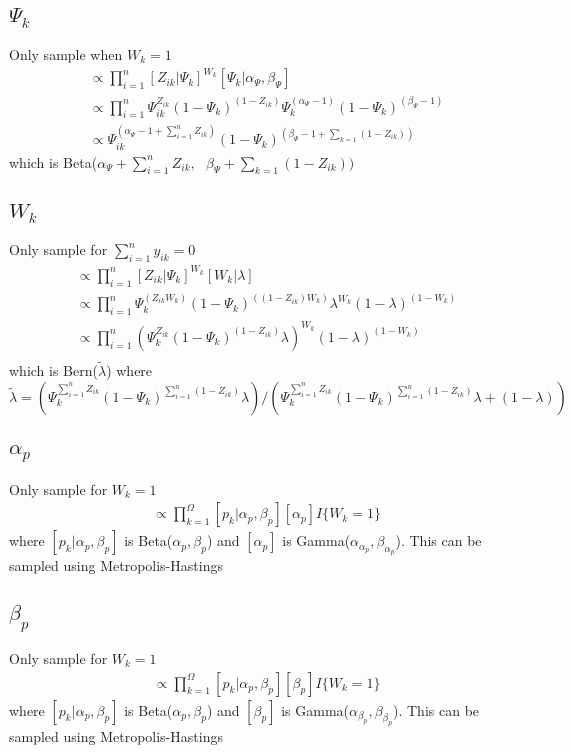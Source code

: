 \documentclass[fleqn]{article}
\begin{document}
\subsection{$\Psi_k$}
%
Only sample when $W_k = 1$
%
\begin{align*}
  [\Psi_k | \cdot] & \propto \prod_{i = 1}^n [Z_{ik} | \Psi_k]^{W_k} [\Psi_k | \alpha_\Psi, \beta_\Psi]\\
  & \propto \prod_{i = 1}^n \Psi_{ik}^{Z_{ik}} (1 - \Psi_k)^{(1 - Z_{ik})} \Psi_k^{(\alpha_\Psi - 1)} (1 - \Psi_k)^{(\beta_\Psi - 1)}\\
  & \propto \Psi_{ik}^{(\alpha_\Psi - 1 + \sum_{i = 1}^n Z_{ik})} (1 - \Psi_k)^{(\beta_\Psi - 1 + \sum_{k = 1} (1 - Z_{ik}))}
\end{align*}
which is Beta($\alpha_\Psi + \sum_{i = 1}^n Z_{ik}, \mbox{ } \beta_\Psi + \sum_{k = 1} (1 - Z_{ik}))$
%
\subsection{$W_k$}
%
Only sample for $\sum_{i = 1}^{n} y_{ik} = 0$
%
\begin{align*}
  [W_k | \cdot] & \propto \prod_{i = 1}^n [Z_{ik} | \Psi_k]^{W_k} [W_k | \lambda]\\
  & \propto \prod_{i = 1}^n \Psi_k^{(Z_{ik} W_k)} (1 - \Psi_k)^{\left( (1 - Z_{ik}) W_k \right)} \lambda^{W_k} (1 - \lambda)^{(1 - W_k)}\\
  & \propto \prod_{i = 1}^n \left(\Psi_k^{Z_{ik}} (1 - \Psi_k)^{(1 - Z_{ik})} \lambda \right)^{W_k} (1 - \lambda)^{(1 - W_k)}\\
\end{align*}
%
which is Bern($\tilde{\lambda}$) where $\tilde{\lambda} = \left(\Psi_k^{\sum_{i = 1}^n Z_{ik}} (1 - \Psi_k)^{\sum_{i = 1}^n (1 - Z_{ik})} \lambda \right) / \left(\Psi_k^{\sum_{i = 1}^n Z_{ik}} (1 - \Psi_k)^{\sum_{i = 1}^n (1 - Z_{ik})} \lambda + (1 - \lambda) \right)$
%
\subsection{$\alpha_p$}
%
Only sample for $W_k = 1$
%
\begin{align*}
  [\alpha_p | \cdot] & \propto \prod_{k = 1}^\Omega [p_k | \alpha_p, \beta_p] [\alpha_p] I\{W_k = 1\}
\end{align*}
where $[p_k | \alpha_p, \beta_p]$ is Beta($\alpha_p, \beta_p$) and $[\alpha_p]$ is Gamma($\alpha_{\alpha_p}, \beta_{\alpha_p}$). This can be sampled using Metropolis-Hastings
%
\subsection{$\beta_p$}
%
Only sample for $W_k = 1$
%
\begin{align*}
  [\beta_p | \cdot] & \propto \prod_{k = 1}^\Omega [p_k | \alpha_p, \beta_p] [\beta_p] I\{W_k = 1\}
\end{align*}
where $[p_k | \alpha_p, \beta_p]$ is Beta($\alpha_p, \beta_p$) and $[\beta_p]$ is Gamma($\alpha_{\beta_p}, \beta_{\beta_p}$). This can be sampled using Metropolis-Hastings
%
\end{document}
